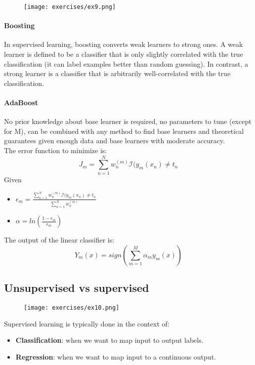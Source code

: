 \begin{figure}[H]
    \centering
    \texttt{[image: exercises/ex9.png]}
\end{figure}

\paragraph{Boosting}
In supervised learning, boosting converts weak learners to strong ones. A weak learner is defined to be a classifier that is only slightly correlated with the true classification (it can label examples better than random guessing). In contrast, a strong learner is a classifier that is arbitrarily well-correlated with the true classification.

\paragraph{AdaBoost}
No prior knowledge about base learner is required, no parameters to tune (except for M), can be combined with any method to find base learners and theoretical guarantees given enough data and base learners with moderate accuracy.\\
The error function to minimize is:
\[J_m=\sum_{n=1}^N w_n^{(m)}\mathcal{I}(y_m(x_n)\neq t_n\]
Given 
\begin{itemize}
\item $\epsilon_m = \frac{\sum_{n=1}^N w_n^{(m)}\mathcal{I}(y_m(x_n)\neq t_n}{\sum_{n=1}^N w_n^{(m)}}$
\item $\alpha=ln(\frac{1-\epsilon_m}{\epsilon_m})$
\end{itemize}
The output of the linear classifier is:
\[Y_m(x)=sign(\sum_{m=1}^M\alpha_my_m(x))\]

\subsection{Unsupervised vs supervised}
\begin{figure}[H]
    \centering
    \texttt{[image: exercises/ex10.png]}
\end{figure}

Supervised learning is typically done in the context of:
\begin{itemize}
\item \textbf{Classification}: when we want to map input to output labels.
\item \textbf{Regression}: when we want to map input to a continuous output.
\end{itemize} 


